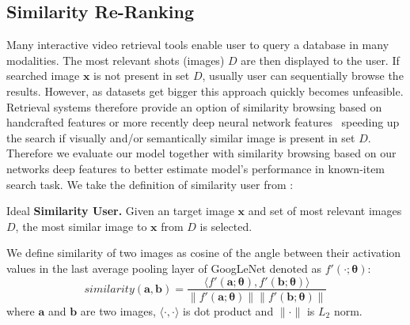 \subsection{Similarity Re-Ranking}
Many interactive video retrieval tools enable user to query a database in many modalities. The most relevant shots (images) $D$ are then displayed to the user. If searched image $\bm{x}$ is not present in set $D$, usually user can sequentially browse the results. However, as datasets get bigger this approach quickly becomes unfeasible. Retrieval systems therefore provide an option of similarity browsing based on handcrafted features or more recently deep neural network features~\cite{lokovc2018revisiting, barthel2018fusing} speeding up the search if visually and/or semantically similar image is present in set $D$. Therefore we evaluate our model together with similarity browsing based on our networks deep features to better estimate model's performance in known-item search task. We take the definition of similarity user from \cite{kovalvcik2017comparison}:
\begin{description}[labelwidth=1em, leftmargin=!]
	\item Ideal \textbf{Similarity User.} Given an target image $\bm{x}$ and set of most relevant images $D$, the most similar image to $\bm{x}$ from $D$ is selected.
\end{description}
We define similarity of two images as cosine of the angle between their activation values in the last average pooling layer of GoogLeNet denoted as $f'(\cdot;\bm{\theta})$:
\begin{equation}
similarity(\bm{a},\bm{b}) = \frac{\langle f'(\bm{a};\bm{\theta}),f'(\bm{b};\bm{\theta})\rangle}{\|f'(\bm{a};\bm{\theta})\|\|f'(\bm{b};\bm{\theta})\|}
\end{equation}
where $\bm{a}$ and $\bm{b}$ are two images, $\langle\cdot,\cdot\rangle$ is dot product and $\|\cdot\|$ is $L_2$ norm.

